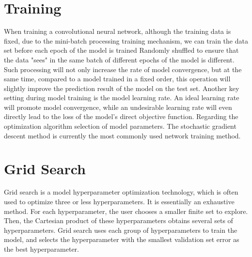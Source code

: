 \section{Training}
\label{cha:training/training}

When training a convolutional neural network, although the training data is fixed, due to the mini-batch processing training mechanism, we can train the data set before each epoch of the model is trained Randomly shuffled to ensure that the data "sees" in the same batch of different epochs of the model is different. Such processing will not only increase the rate of model convergence, but at the same time, compared to a model trained in a fixed order, this operation will slightly improve the prediction result of the model on the test set.
Another key setting during model training is the model learning rate. An ideal learning rate will promote model convergence, while an undesirable learning rate will even directly lead to the loss of the model's direct objective function. 
Regarding the optimization algorithm selection of model parameters. The stochastic gradient descent method is currently the most commonly used network training method.

\section{Grid Search}
\label{cha:training/grid search}

Grid search is a model hyperparameter optimization technology, which is often used to optimize three or less hyperparameters. It is essentially an exhaustive method. For each hyperparameter, the user chooses a smaller finite set to explore. Then, the Cartesian product of these hyperparameters obtains several sets of hyperparameters. Grid search uses each group of hyperparameters to train the model, and selects the hyperparameter with the smallest validation set error as the best hyperparameter.

